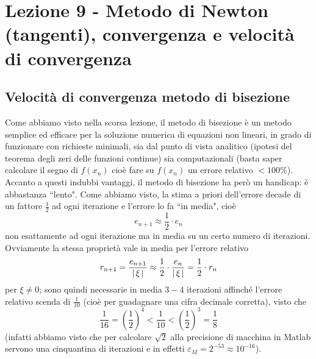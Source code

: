 \section[Lezione 9 - Metodo di Newton]{Lezione 9 - Metodo di Newton (tangenti), convergenza e velocità di convergenza}
\subsection{Velocità di convergenza metodo di bisezione}
Come abbiamo visto nella scorsa lezione, il metodo di bisezione è un metodo semplice ed efficace per la soluzione numerica di equazioni non lineari, in grado di funzionare con richieste minimali, sia dal punto di vista analitico (ipotesi del teorema degli zeri delle funzioni continue) sia computazionali (basta saper calcolare il segno di $f(x_n)$ cioè fare su $f(x_n)$ un errore relativo $<100\%$).\\
Accanto a questi indubbi vantaggi, il metodo di bisezione ha però un handicap: è abbastanza ``lento". Come abbiamo visto, la stima a priori dell'errore decade di un fattore $\frac{1}{2}$ ad ogni iterazione e l'errore lo fa ``in media", cioè 
\[ e_{n+1} \approx \frac{1}{2} \cdot e_n \]
non esattamente ad ogni iterazione ma in media su un certo numero di iterazioni.\\
Ovviamente la stessa proprietà vale in media per l'errore relativo
\[ r_{n+1}=\frac{e_{n+1}}{\lvert\,\xi\,\rvert} \approx \frac{1}{2} \cdot \frac{e_n}{\lvert\,\xi\,\rvert} = \frac{1}{2} \cdot r_n \]
per $\xi \ne 0$; sono quindi necessarie in media $3-4$ iterazioni affinché l'errore relativo scenda di $\frac{1}{10}$ (cioè per guadagnare una cifra decimale corretta), visto che 
\[\frac{1}{16} = \left(\frac{1}{2}\right)^4 < \frac{1}{10} < \left(\frac{1}{2}\right)^3 = \frac{1}{8}\] 
(infatti abbiamo visto che per calcolare $\sqrt{2}$ alla precisione di macchina in Matlab servono una cinquantina di iterazioni e in effetti $\varepsilon_M = 2^{-53} \approx 10^{-16}$).

